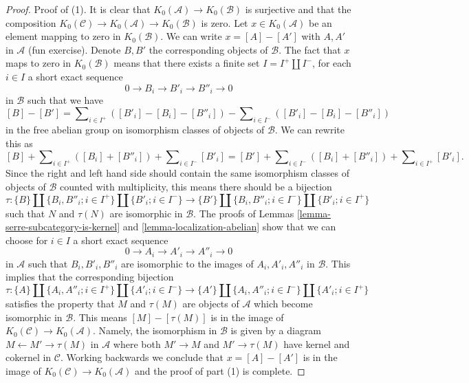 \begin{proof}
Proof of (1). It is clear that $K_0(\mathcal{A}) \to K_0(\mathcal{B})$
is surjective and that the composition $K_0(\mathcal{C}) \to
K_0(\mathcal{A}) \to K_0(\mathcal{B})$ is zero. Let $x \in K_0(\mathcal{A})$
be an element mapping to zero in $K_0(\mathcal{B})$. We can write
$x = [A] - [A']$ with $A, A'$ in $\mathcal{A}$ (fun exercise).
Denote $B, B'$ the corresponding objects of $\mathcal{B}$. The fact that
$x$ maps to zero in $K_0(\mathcal{B})$
means that there exists a finite set $I = I^+ \amalg I^{-}$,
for each $i \in I$ a short exact sequence
$$
0 \to B_i \to B'_i \to B''_i \to 0
$$
in $\mathcal{B}$ such that we have
$$
[B] - [B'] = \sum\nolimits_{i \in I^{+}} ([B'_i] - [B_i] - [B''_i])
-
\sum\nolimits_{i \in I^{-}} ([B'_i] - [B_i] - [B''_i])
$$
in the free abelian group on isomorphism classes of objects of $\mathcal{B}$.
We can rewrite this as
$$
[B]
+ \sum\nolimits_{i \in I^{+}} ([B_i] + [B''_i])
+ \sum\nolimits_{i \in I^{-}} [B'_i]
=
[B']
+ \sum\nolimits_{i \in I^{-}} ([B_i] + [B''_i])
+ \sum\nolimits_{i \in I^{+}} [B'_i].
$$
Since the right and left hand side should contain the same isomorphism classes
of objects of $\mathcal{B}$ counted with multiplicity, this means there should
be a bijection
$$
\tau :
\{B\} \amalg \{B_i, B''_i; i \in I^+\} \amalg \{B'_i; i \in I^-\}
\longrightarrow
\{B'\} \amalg \{B_i, B''_i; i \in I^-\} \amalg \{B'_i; i \in I^+\}
$$
such that $N$ and $\tau(N)$ are isomorphic in $\mathcal{B}$.
The proofs of Lemmas \ref{lemma-serre-subcategory-is-kernel} and
\ref{lemma-localization-abelian} show that we can choose for $i \in I$
a short exact sequence
$$
0 \to A_i \to A'_i \to A''_i \to 0
$$
in $\mathcal{A}$ such that $B_i, B'_i, B''_i$ are isomorphic to the
images of $A_i, A'_i, A''_i$ in $\mathcal{B}$. This implies that the
corresponding bijection
$$
\tau :
\{A\} \amalg \{A_i, A''_i; i \in I^+\} \amalg \{A'_i; i \in I^-\}
\longrightarrow
\{A'\} \amalg \{A_i, A''_i; i \in I^-\} \amalg \{A'_i; i \in I^+\}
$$
satisfies the property that $M$ and $\tau(M)$ are objects of $\mathcal{A}$
which become isomorphic in $\mathcal{B}$. This means $[M] - [\tau(M)]$
is in the image of $K_0(\mathcal{C}) \to K_0(\mathcal{A})$. Namely,
the isomorphism in $\mathcal{B}$ is given by a diagram
$M \leftarrow M' \rightarrow \tau(M)$ in $\mathcal{A}$ where both
$M' \to M$ and $M' \to \tau(M)$ have kernel and cokernel in $\mathcal{C}$.
Working backwards we conclude that $x = [A] - [A']$ is in the image
of $K_0(\mathcal{C}) \to K_0(\mathcal{A})$ and the proof of part (1)
is complete.


\end{proof}
